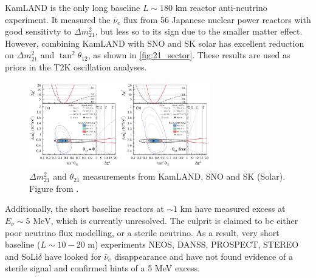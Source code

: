 KamLAND is the only long baseline $L\sim180\text{ km}$ reactor anti-neutrino experiment. It measured the $\bar{\nu}_e$ flux from 56 Japanese nuclear power reactors with good sensitivty to $\Delta m^2_{21}$, but less so to its sign due to the smaller matter effect. However, combining KamLAND with SNO and SK solar has excellent reduction on $\Delta m^2_{21}$ and $\tan^2\theta_{12}$, as shown in \autoref{fig:21_sector}. These results are used as priors in the T2K oscillation analyses.
\begin{figure}[h]
	\includegraphics[width=0.7\textwidth, trim={0mm 0mm 0mm 0mm}, clip,page=1]{figures/theory/kamland_solar_comb}
	\caption{$\Delta m^2_{21}$ and $\theta_{21}$ measurements from KamLAND, SNO and SK (Solar). Figure from \cite{kamland_2011}.}
	\label{fig:21_sector}
\end{figure}

Additionally, the short baseline reactors at $\sim1\text{ km}$ have measured excess at $E_\nu\sim5\text{ MeV}$\cite{double_chooz, daya_bay, reno}, which is currently unresolved. The culprit is claimed to be either poor neutrino flux modelling, or a sterile neutrino\cite{huber_neos,steriles}. As a result, very short baseline ($L\sim10-20\text{ m}$) experiments NEOS\cite{neos}, DANSS\cite{danss}, PROSPECT\cite{prospect}, STEREO\cite{stereo} and SoLi$\delta$\cite{solid} have looked for $\bar{\nu}_e$ disappearance and have not found evidence of a sterile signal and confirmed hints of a 5 MeV excess.